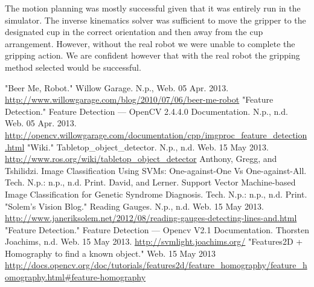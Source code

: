 \documentclass[letterpaper, 10 pt, conference]{ieeeconf}  %
\begin{document}
The motion planning was mostly successful given that it was entirely run in the simulator. The inverse kinematics solver was sufficient to move the gripper to the designated cup in the correct orientation and then away from the cup arrangement. However, without the real robot we were unable to complete the gripping action. We are confident however that with the real robot the gripping method selected would be successful.

\begin{thebibliography}{99}

 "Beer Me, Robot." Willow Garage. N.p., Web. 05 Apr. 2013. \url{http://www.willowgarage.com/blog/2010/07/06/beer-me-robot}
 "Feature Detection." Feature Detection — OpenCV 2.4.4.0 Documentation. N.p., n.d. Web. 05 Apr. 2013. \url{http://opencv.willowgarage.com/documentation/cpp/imgproc_feature_detection.html}
 "Wiki." Tabletop\_object\_detector. N.p., n.d. Web. 15 May 2013. \url{http://www.ros.org/wiki/tabletop_object_detector}
 Anthony, Gregg, and Tshilidzi. Image Classification Using SVMs: One-against-One Vs One-against-All. Tech. N.p.: n.p., n.d. Print.
 David, and Lerner. Support Vector Machine-based Image Classiﬁcation for Genetic Syndrome Diagnosis. Tech. N.p.: n.p., n.d. Print.
 "Solem's Vision Blog." Reading Gauges. N.p., n.d. Web. 15 May 2013. \url{http://www.janeriksolem.net/2012/08/reading-gauges-detecting-lines-and.html}
 "Feature Detection." Feature Detection — Opencv V2.1 Documentation. Thorsten Joachims, n.d. Web. 15 May 2013. \url{http://svmlight.joachims.org/}
 "Features2D + Homography to find a known object." Web. 15 May 2013 \url{http://docs.opencv.org/doc/tutorials/features2d/feature_homography/feature_homography.html#feature-homography}






\end{thebibliography}
\end{document}
